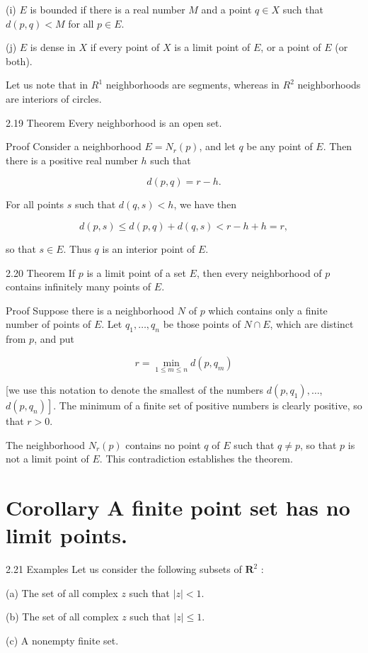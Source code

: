 \documentclass[10pt]{article}
\begin{document}
(i) $E$ is bounded if there is a real number $M$ and a point $q \in X$ such that $d(p, q)<M$ for all $p \in E$.

(j) $E$ is dense in $X$ if every point of $X$ is a limit point of $E$, or a point of $E$ (or both).

Let us note that in $R^{1}$ neighborhoods are segments, whereas in $R^{2}$ neighborhoods are interiors of circles.

2.19 Theorem Every neighborhood is an open set.

Proof Consider a neighborhood $E=N_{r}(p)$, and let $q$ be any point of $E$. Then there is a positive real number $h$ such that

$$
d(p, q)=r-h .
$$

For all points $s$ such that $d(q, s)<h$, we have then

$$
d(p, s) \leq d(p, q)+d(q, s)<r-h+h=r,
$$

so that $s \in E$. Thus $q$ is an interior point of $E$.

2.20 Theorem If $p$ is a limit point of a set $E$, then every neighborhood of $p$ contains infinitely many points of $E$.

Proof Suppose there is a neighborhood $N$ of $p$ which contains only a finite number of points of $E$. Let $q_{1}, \ldots, q_{n}$ be those points of $N \cap E$, which are distinct from $p$, and put

$$
r=\min _{1 \leq m \leq n} d\left(p, q_{m}\right)
$$

[we use this notation to denote the smallest of the numbers $d\left(p, q_{1}\right), \ldots$, $\left.d\left(p, q_{n}\right)\right]$. The minimum of a finite set of positive numbers is clearly positive, so that $r>0$.

The neighborhood $N_{r}(p)$ contains no point $q$ of $E$ such that $q \neq p$, so that $p$ is not a limit point of $E$. This contradiction establishes the theorem.

\section{Corollary A finite point set has no limit points.}
2.21 Examples Let us consider the following subsets of $\boldsymbol{R}^{2}$ :

(a) The set of all complex $z$ such that $|z|<1$.

(b) The set of all complex $z$ such that $|z| \leq 1$.

(c) A nonempty finite set.
\end{document}
